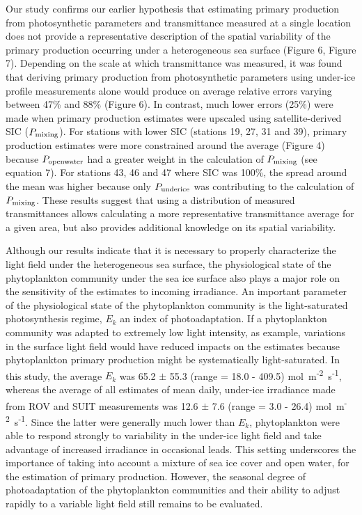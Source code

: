\documentclass[draft]{agujournal2018}
\newcommand{\ppopenwater}{\ensuremath{P_{\textnormal{\scriptsize openwater}}}}
\newcommand{\ppmixing}{\ensuremath{P_{\textnormal{\scriptsize mixing}}}}
\newcommand{\ppunderice}{\ensuremath{P_{\textnormal{\scriptsize underice}}}}
\newcommand{\micromol}{\textmu mol~m\textsuperscript{-2}~s\textsuperscript{-1}}
\begin{document}
Our study confirms our earlier hypothesis that estimating primary production from photosynthetic parameters and transmittance measured at a single location does not provide a representative description of the spatial variability of the primary production occurring under a heterogeneous sea surface (Figure 6, Figure 7). Depending on the scale at which transmittance was measured, it was found that deriving primary production from photosynthetic parameters using under-ice profile measurements alone would produce on average relative errors varying between 47\% and 88\% (Figure 6). In contrast, much lower errors (25\%) were made when primary production estimates were upscaled using satellite-derived SIC (\ppmixing{}). For stations with lower SIC (stations 19, 27, 31 and 39), primary production estimates were more constrained around the average (Figure 4) because \ppopenwater{} had a greater weight in the calculation of \ppmixing{} (see equation 7). For stations 43, 46 and 47 where SIC was 100\%, the spread around the mean was higher because only \ppunderice{} was contributing to the calculation of \ppmixing{}. These results suggest that using a distribution of measured transmittances allows calculating a more representative transmittance average for a given area, but also provides additional knowledge on its spatial variability.

Although our results indicate that it is necessary to properly characterize the light field under the heterogeneous sea surface, the physiological state of the phytoplankton community under the sea ice surface also plays a major role on the sensitivity of the estimates to incoming irradiance. An important parameter of the physiological state of the phytoplankton community is the light-saturated photosynthesis regime, $E_k$ an index of photoadaptation. If a phytoplankton community was adapted to extremely low light intensity, as example,  variations in the surface light field would have reduced impacts on the estimates because phytoplankton primary production might be systematically light-saturated. In this study, the average $E_k$ was 65.2 $\pm$ 55.3 (range = 18.0 - 409.5) \micromol{}, whereas the average of  all estimates of mean daily, under-ice irradiance made from ROV and SUIT measurements was 12.6 $\pm$ 7.6 (range = 3.0 - 26.4) \micromol{}. Since the latter were generally much lower than $E_k$, phytoplankton were able to respond strongly to variability in the under-ice light field and take advantage of increased irradiance in occasional leads. This setting underscores the importance of taking into account a mixture of sea ice cover and open water, for  the estimation of primary production. However, the seasonal degree of photoadaptation of the phytoplankton communities and their ability to adjust rapidly to a variable light field still remains to be evaluated.
\end{document}
